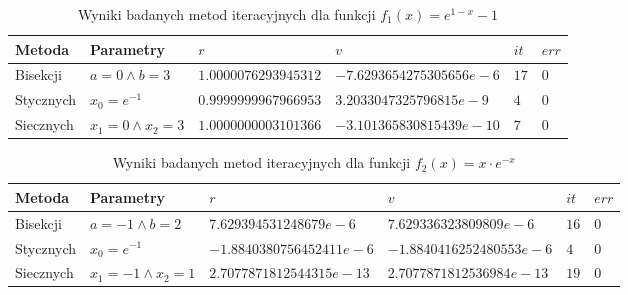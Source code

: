 \documentclass[11pt]{article}
\begin{document}
        \begin{table}[h!]
        \centering
        \begin{tabularx}{0.88\textwidth}{l l l l l l }
            \hline
            Metoda & Parametry & $r$ & $v$ & $it$ & $err$ \\
            \hline
            Bisekcji & $a = 0 \land b = 3$ & $1.0000076293945312$ & $-7.6293654275305656e-6$ & $17$ & $0$ \\
            Stycznych & $x_0 = e^{-1}$ & $0.9999999967966953$ & $3.2033047325796815e-9$ & $4$ & $0$ \\
            Siecznych & $x_1 = 0 \land x_2 = 3$ & $1.0000000003101366$ & $-3.101365830815439e-10$ & $7$ & $0$ \\
            \hline
        \end{tabularx}
        \label{table:ex6_f1}
        \caption{Wyniki badanych metod iteracyjnych dla funkcji $f_1(x) = e^{1 - x} - 1$}
        \end{table}

        \begin{table}[h!]
        \centering
        \begin{tabularx}{0.965\textwidth}{l l l l l l }
            \hline
            Metoda & Parametry & $r$ & $v$ & $it$ & $err$ \\
            \hline
            Bisekcji & $a = -1 \land b = 2$ & $7.629394531248679e-6$ & $7.629336323809809e-6$ & $16$ & $0$ \\
            Stycznych & $x_0 = e^{-1}$ & $-1.8840380756452411e-6$ & $-1.8840416252480553e-6$ & $4$ & $0$ \\
            Siecznych & $x_1 = -1 \land x_2 = 1$ & $2.7077871812544315e-13$ & $2.7077871812536984e-13$ & $19$ & $0$ \\
            \hline
        \end{tabularx}
        \label{table:ex6_f2}
        \caption{Wyniki badanych metod iteracyjnych dla funkcji $f_2(x) = x \cdot e^{-x}$}
        \end{table}

        \newpage
\end{document}
